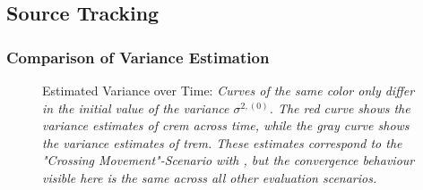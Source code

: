 
\subsection{Source Tracking}

\subsubsection{Comparison of Variance Estimation}

\begin{figure}[H]
	\setlength\figureheight{6cm}
	\setlength{}
	\iftoggle{quick}{%
		\texttt{[image: plots/tracking/variance/crossing-variance-comparison.png]}
	}{%
		
	}
	\caption[Estimated Variance over Time]{Estimated Variance over Time: \itshape Curves of the same color only differ in the initial value of the variance $\sigma^{2,(0)}$. The red curve shows the variance estimates of \gls{crem} across time, while the gray curve shows the variance estimates of \gls{trem}. These estimates correspond to the "Crossing Movement"-Scenario with , but the convergence behaviour visible here is the same across all other evaluation scenarios.}
	\label{fig:trackVarComp}
\end{figure}

